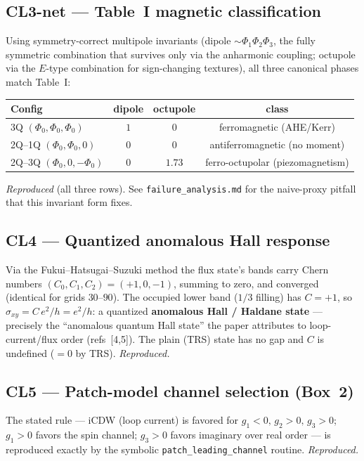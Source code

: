 \documentclass[11pt]{article}
\begin{document}
\subsection*{CL3-net --- Table~I magnetic classification}
Using symmetry-correct multipole invariants (dipole $\sim\Phi_1\Phi_2\Phi_3$,
the fully symmetric combination that survives only via the anharmonic coupling;
octupole via the $E$-type combination for sign-changing textures), all three
canonical phases match Table~I:
\begin{center}
\begin{tabular}{lccc}
\toprule
Config & dipole & octupole & class \\
\midrule
3Q $(\Phi_0,\Phi_0,\Phi_0)$ & $1$ & $0$ & ferromagnetic (AHE/Kerr) \\
2Q--1Q $(\Phi_0,\Phi_0,0)$  & $0$ & $0$ & antiferromagnetic (no moment) \\
2Q--3Q $(\Phi_0,0,-\Phi_0)$ & $0$ & $1.73$ & ferro-octupolar (piezomagnetism) \\
\bottomrule
\end{tabular}
\end{center}
\emph{Reproduced} (all three rows). See \texttt{failure\_analysis.md} for the
naive-proxy pitfall that this invariant form fixes.

\subsection*{CL4 --- Quantized anomalous Hall response}
Via the Fukui--Hatsugai--Suzuki method the flux state's bands carry Chern
numbers $(C_0,C_1,C_2)=(+1,0,-1)$, summing to zero, and converged (identical for
grids $30$--$90$). The occupied lower band ($1/3$ filling) has $C=+1$, so
$\sigma_{xy}=C\,e^2/h=e^2/h$: a quantized \textbf{anomalous Hall / Haldane state}
--- precisely the ``anomalous quantum Hall state'' the paper attributes to
loop-current/flux order (refs~[4,5]). The plain (TRS) state has no gap and
$C$ is undefined ($=0$ by TRS). \emph{Reproduced.}

\subsection*{CL5 --- Patch-model channel selection (Box~2)}
The stated rule --- iCDW (loop current) is favored for $g_1<0,\,g_2>0,\,g_3>0$;
$g_1>0$ favors the spin channel; $g_3>0$ favors imaginary over real order ---
is reproduced exactly by the symbolic \texttt{patch\_leading\_channel} routine.
\emph{Reproduced.}
\end{document}
